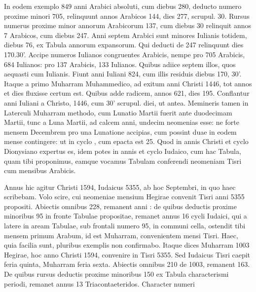 In eodem exemplo 849 anni Arabici absoluti, cum diebus 280,
deducto numero proxime minori 705, relinquunt annos Arabicos
144, dies 277, scrupul. %
30.
Rursus numerus proxime
minor annorum Arabicorum 137, cum diebus 30 relinquit
annos 7 Arabicos, cum diebus 247.
Anni septem Arabici
sunt minores Iulianis totidem, diebus 76, ex Tabula annorum
expansorum.
Qui deducti de 247 relinquunt dies 170.30'.
Accipe numeros Iulianos congruentes Arabicis, nempe pro
705 Arabicis, 684 Iulianos: pro 137 Arabicis, 133 Iulianos.
Quibus adiice septem illos, quos aequasti cum Iulianis.
Fiunt
anni Iuliani 824, cum illis residuis diebus 170, 30'.
Itaque
a primo Muharram Muhammedico, ad exitum anni
Christi 1446, tot annos et dies fluxisse certum est.
Quibus adde
radicem, annos 621, dies 195.
Conflantur anni Iuliani a Christo,
1446, cum 30' scrupul. %
diei, ut antea.
Memineris tamen in Laterculi
Muharram methodo, cum Lunatio Martii fuerit ante
duodecimam Martii, tunc a Luna Martii, ad calcem
anni, undecim neomenias esse: ne forte mensem Decembrem
pro una Lunatione accipias, cum possint duae in eodem mense
contingere: ut in cyclo , cum epacta est 25.
Quod in
annis Christi et cyclo
Dionysiano expertus
es, idem potes
in annis et cyclo
Iudaico, cum hac
Tabula, quam tibi
proponimus, eamque
vocamus Tabulam
conferendi neomeniam
Tisri cum mensibus
Arabicis.
\begin{table}[tbp]
  
\end{table}
Annus
hic agitur Christi
1594, Iudaicus 5355,
ab hoc Septembri, in quo haec scribebam.
Volo scire, cui neomeniae
mensium Hegirae convenit Tisri anni 5355 propositi.
Abiectis omnibus
228, remanent anni : de quibus deductis proxime minoribus
95 in fronte Tabulae propositae, remanet annus 16 cycli Iudaici, qui a
latere in aream Tabulae, sub frontali numero 95, in communi cella,
ostendit tibi mensem primum Arabum, id est Muharram, convenientem
mensi Tisri.
%
Haec, quia facilia sunt, pluribus exemplis non confirmabo.
Itaque dices Muharram 1003 Hegirae, hoc anno Christi 1594,
convenire in Tisri 5355.
Sed Iudaicus Tisri caepit feria quinta, Muharram feria sexta.
Abiectis omnibus 210 de 1003, remanent 163.
De quibus rursus deductis proxime minoribus 150 ex Tabula characterismi
periodi, remanet annus 13 Triacontaeteridos.
Character numeri

